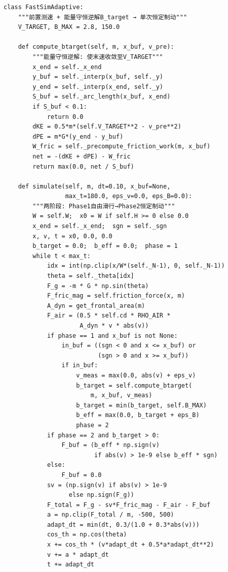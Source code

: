 \documentclass[12pt,a4paper]{ctexart}
\begin{document}
{\small
\begin{lstlisting}
class FastSimAdaptive:
    """前置测速 + 能量守恒逆解B_target → 单次恒定制动"""
    V_TARGET, B_MAX = 2.8, 150.0

    def compute_btarget(self, m, x_buf, v_pre):
        """能量守恒逆解: 使末速收敛至V_TARGET"""
        x_end = self._x_end
        y_buf = self._interp(x_buf, self._y)
        y_end = self._interp(x_end, self._y)
        S_buf = self._arc_length(x_buf, x_end)
        if S_buf < 0.1:
            return 0.0
        dKE = 0.5*m*(self.V_TARGET**2 - v_pre**2)
        dPE = m*G*(y_end - y_buf)
        W_fric = self._precompute_friction_work(m, x_buf)
        net = -(dKE + dPE) - W_fric
        return max(0.0, net / S_buf)

    def simulate(self, m, dt=0.10, x_buf=None,
                 max_t=180.0, eps_v=0.0, eps_B=0.0):
        """两阶段: Phase1自由滑行→Phase2恒定制动"""
        W = self.W;  x0 = W if self.H >= 0 else 0.0
        x_end = self._x_end;  sgn = self._sgn
        x, v, t = x0, 0.0, 0.0
        b_target = 0.0;  b_eff = 0.0;  phase = 1
        while t < max_t:
            idx = int(np.clip(x/W*(self._N-1), 0, self._N-1))
            theta = self._theta[idx]
            F_g = -m * G * np.sin(theta)
            F_fric_mag = self.friction_force(x, m)
            A_dyn = get_frontal_area(m)
            F_air = (0.5 * self.cd * RHO_AIR *
                     A_dyn * v * abs(v))
            if phase == 1 and x_buf is not None:
                in_buf = ((sgn < 0 and x <= x_buf) or
                          (sgn > 0 and x >= x_buf))
                if in_buf:
                    v_meas = max(0.0, abs(v) + eps_v)
                    b_target = self.compute_btarget(
                        m, x_buf, v_meas)
                    b_target = min(b_target, self.B_MAX)
                    b_eff = max(0.0, b_target + eps_B)
                    phase = 2
            if phase == 2 and b_target > 0:
                F_buf = (b_eff * np.sign(v)
                         if abs(v) > 1e-9 else b_eff * sgn)
            else:
                F_buf = 0.0
            sv = (np.sign(v) if abs(v) > 1e-9
                  else np.sign(F_g))
            F_total = F_g - sv*F_fric_mag - F_air - F_buf
            a = np.clip(F_total / m, -500, 500)
            adapt_dt = min(dt, 0.3/(1.0 + 0.3*abs(v)))
            cos_th = np.cos(theta)
            x += cos_th * (v*adapt_dt + 0.5*a*adapt_dt**2)
            v += a * adapt_dt
            t += adapt_dt
\end{lstlisting}
}
\end{document}
